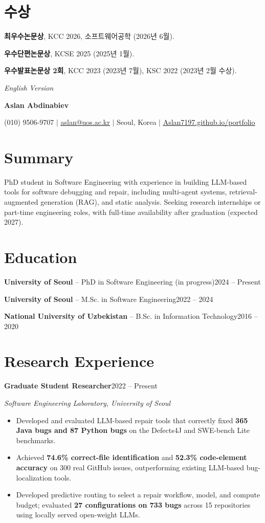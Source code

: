 \documentclass[letterpaper,11pt]{article}
\makeatletter
\newcommand{\cvHeader}[3]{%
  {\centering
    {\footnotesize\textit{#1}\par}
    \vspace{1pt}
    {\Large\textbf{#2}\par}
    \vspace{1pt}
    (010) 9506-9707 $|$ \href{mailto:aslan@uos.ac.kr}{\underline{aslan@uos.ac.kr}} $|$ #3 $|$
    \href{https://Aslan7197.github.io/portfolio}{\underline{Aslan7197.github.io/portfolio}}\par
  }
  \vspace{3pt}
}
\newcommand{\educationEntry}[3]{\textbf{#1} -- #2\hfill #3\par}
\makeatother
\begin{document}
\section{수상}
\textbf{최우수논문상}, KCC 2026, 소프트웨어공학 (2026년 6월).\par
\textbf{우수단편논문상}, KCSE 2025 (2025년 1월).\par
\textbf{우수발표논문상 2회}, KCC 2023 (2023년 7월), KSC 2022 (2023년 2월 수상).

\newpage
\cvHeader{English Version}{Aslan Abdinabiev}{Seoul, Korea}

\section{Summary}
PhD student in Software Engineering with experience in building LLM-based tools for software debugging and repair, including multi-agent systems, retrieval-augmented generation (RAG), and static analysis. Seeking research internships or part-time engineering roles, with full-time availability after graduation (expected 2027).

\section{Education}
\educationEntry{University of Seoul}{PhD in Software Engineering (in progress)}{2024 -- Present}
\educationEntry{University of Seoul}{M.Sc. in Software Engineering}{2022 -- 2024}
\educationEntry{National University of Uzbekistan}{B.Sc. in Information Technology}{2016 -- 2020}

\section{Research Experience}
\textbf{Graduate Student Researcher}\hfill 2022 -- Present\par
\textit{Software Engineering Laboratory, University of Seoul}
\begin{itemize}
  \item Developed and evaluated LLM-based repair tools that correctly fixed \textbf{365 Java bugs and 87 Python bugs} on the Defects4J and SWE-bench Lite benchmarks.
  \item Achieved \textbf{74.6\% correct-file identification} and \textbf{52.3\% code-element accuracy} on 300 real GitHub issues, outperforming existing LLM-based bug-localization tools.
  \item Developed predictive routing to select a repair workflow, model, and compute budget; evaluated \textbf{27 configurations on 733 bugs} across 15 repositories using locally served open-weight LLMs.
\end{itemize}
\end{document}
